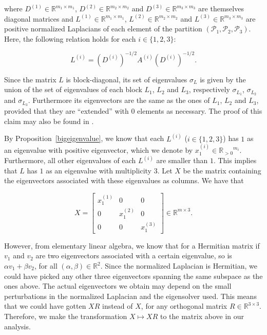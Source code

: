 where $D^{(1)} \in \mathbb R ^{m_1 \times m_1}$, $D^{(2)} \in \mathbb R ^{m_2 \times m_2}$ and $D^{(3)} \in \mathbb R ^{m_3 \times m_3}$ are themselves diagonal matrices and $L^{(1)} \in \mathbb R ^{m_1 \times m_1}$, $L^{(2)} \in \mathbb R ^{m_2 \times m_2}$ and $L^{(3)} \in \mathbb R ^{m_3 \times m_3}$ are positive normalized Laplacians of each element of the partition $(\mathcal P_1, \mathcal P_2, \mathcal P_3)$.
Here, the following relation holds for each $i \in \{1, 2, 3 \}$:

\begin{equation}
   L^{(i)} = \left( D^{(i)} \right) ^{-1/2} A^{(i)} \left( D^{(i)} \right) ^{-1/2}.
\end{equation}

Since the matrix $L$ is block-diagonal, its set of eigenvalues $\sigma _L$ is given by the union of the set of eigenvalues of each block $L_1$, $L_2$ and $L_3$, respectively $\sigma_{L_1}$, $\sigma_{L_2}$ and $\sigma_{L_3}$.
Furthermore its eigenvectors are the same as the ones of $L_1$, $L_2$ and $L_3$, provided that they are ``extended'' with $0$ elements as necessary. 
The proof of this claim may also be found in \cite{mahoney}.

By Proposition~\vref{bigeigenvalue}, we know that each $L^{(i)}$ ($i \in \{1, 2, 3 \}$) has $1$ as an eigenvalue with positive eigenvector, which we denote by $x_1^{(i)} \in {\mathbb R_{>0}}^{m_i} $. Furthermore, all other eigenvalues of each $L^{(i)}$ are smaller than $1$.
This implies that $L$ has $1$ as an eigenvalue with multiplicity $3$.
Let $X$ be the matrix containing the eigenvectors associated with these eigenvalues as columns. We have that 

\begin{equation}
   X =
   \begin{bmatrix}
      x_1^{(1)} & 0 & 0 \\
      0 & x_1^{(2)} & 0 \\
      0 & 0 & x_1^{(3)}
   \end{bmatrix}
   \in \mathbb R^{m \times 3}.
\end{equation}

However, from elementary linear algebra, we know that for a Hermitian matrix if $v_1$ and $v_2$ are two eigenvectors associated with a certain eigenvalue, so is $\alpha v_1 + \beta v_2$, for all $(\alpha, \beta) \in \mathbb R ^2$.
Since the normalized Laplacian is Hermitian, we could have picked any other three eigenvectors spanning the same subspace as the ones above.
The actual eigenvectors we obtain may depend on the small perturbations in the normalized Laplacian and the eigensolver used.
This means that we could have gotten $XR$ instead of $X$, for any orthogonal matrix $R \in \mathbb{R}^{3 \times 3}$.
Therefore, we make the transformation $X \longmapsto XR$ to the matrix above in our analysis.

